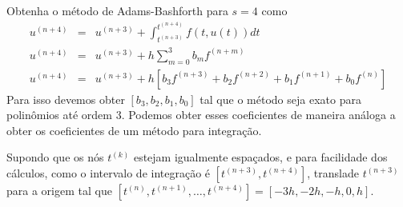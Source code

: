 \begin{ex} Obtenha o método de Adams-Bashforth para $s=4$ como
\begin{eqnarray}
  u^{(n+4)}  &=& u^{(n+3)}  + \int _{t^{(n+3)}}^{t^{(n+4)}} f(t,u(t)) dt \\
  u^{(n+4)}  &=& u^{(n+3)}  + h \sum_{m=0}^{3} b_m f^{(n+m)} \\
  u^{(n+4)}  &=& u^{(n+3)}  + h \left[b_3f^{(n+3)} +b_2f^{(n+2)} +b_1f^{(n+1)} +b_0f^{(n)}\right]
\end{eqnarray}
Para isso devemos obter $[b_3,b_2,b_1,b_0]$ tal que o método seja exato para polinômios até ordem $3$. Podemos obter esses coeficientes de maneira análoga a obter os coeficientes de um método para integração.

Supondo que os nós $t^{(k)}$ estejam igualmente espaçados, e para facilidade dos cálculos, como o intervalo de integração é $[t^{(n+3)},t^{(n+4)}]$, translade $t^{(n+3)}$ para a origem tal que $[t^{(n)},t^{(n+1)},\ldots ,t^{(n+4)}]=[-3h,-2h,-h,0,h]$.


\end{ex}
